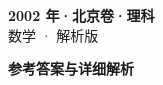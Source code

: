\documentclass[zihao=-4, a4paper]{ctexart}
\begin{document}
\begin{center}
  {\Large\bfseries 2002 年·北京卷·理科}\\[4pt]
  {\large 数学 · 解析版}
\end{center}
\medskip
{}

\clearpage
{}
\begin{center}{\Large\bfseries 参考答案与详细解析}\end{center}
\medskip

\end{document}
